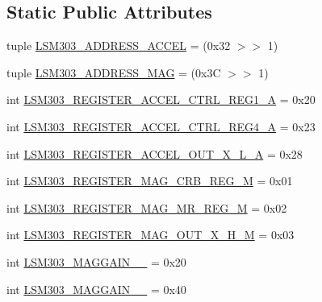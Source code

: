 \subsection*{Static Public Attributes}
\begin{DoxyCompactItemize}
\item 
tuple \hyperlink{classdriver_1_1DRIVER__CORE_1_1Adafruit__LSM303_a24ad319884adc1c09dd29f423b8b6692}{L\+S\+M303\+\_\+\+A\+D\+D\+R\+E\+S\+S\+\_\+\+A\+C\+C\+E\+L} = (0x32 $>$$>$ 1)
\item 
tuple \hyperlink{classdriver_1_1DRIVER__CORE_1_1Adafruit__LSM303_a0b503ed9efa5d7a4d6edc9e02d1cd61f}{L\+S\+M303\+\_\+\+A\+D\+D\+R\+E\+S\+S\+\_\+\+M\+A\+G} = (0x3\+C $>$$>$ 1)
\item 
int \hyperlink{classdriver_1_1DRIVER__CORE_1_1Adafruit__LSM303_ac907d5dc53fef3f3a59a99e7dd969de2}{L\+S\+M303\+\_\+\+R\+E\+G\+I\+S\+T\+E\+R\+\_\+\+A\+C\+C\+E\+L\+\_\+\+C\+T\+R\+L\+\_\+\+R\+E\+G1\+\_\+\+A} = 0x20
\item 
int \hyperlink{classdriver_1_1DRIVER__CORE_1_1Adafruit__LSM303_ab9fecee305847de9273f660412fccf01}{L\+S\+M303\+\_\+\+R\+E\+G\+I\+S\+T\+E\+R\+\_\+\+A\+C\+C\+E\+L\+\_\+\+C\+T\+R\+L\+\_\+\+R\+E\+G4\+\_\+\+A} = 0x23
\item 
int \hyperlink{classdriver_1_1DRIVER__CORE_1_1Adafruit__LSM303_a9db7d714f9448a3ac4121457f1996634}{L\+S\+M303\+\_\+\+R\+E\+G\+I\+S\+T\+E\+R\+\_\+\+A\+C\+C\+E\+L\+\_\+\+O\+U\+T\+\_\+\+X\+\_\+\+L\+\_\+\+A} = 0x28
\item 
int \hyperlink{classdriver_1_1DRIVER__CORE_1_1Adafruit__LSM303_a9ce34b06b2a881fe87f4acf7275e788d}{L\+S\+M303\+\_\+\+R\+E\+G\+I\+S\+T\+E\+R\+\_\+\+M\+A\+G\+\_\+\+C\+R\+B\+\_\+\+R\+E\+G\+\_\+\+M} = 0x01
\item 
int \hyperlink{classdriver_1_1DRIVER__CORE_1_1Adafruit__LSM303_af17a9acb25451a4a2c5f388ff6f95754}{L\+S\+M303\+\_\+\+R\+E\+G\+I\+S\+T\+E\+R\+\_\+\+M\+A\+G\+\_\+\+M\+R\+\_\+\+R\+E\+G\+\_\+\+M} = 0x02
\item 
int \hyperlink{classdriver_1_1DRIVER__CORE_1_1Adafruit__LSM303_a39399d95adf47130963ad6228b41f5b5}{L\+S\+M303\+\_\+\+R\+E\+G\+I\+S\+T\+E\+R\+\_\+\+M\+A\+G\+\_\+\+O\+U\+T\+\_\+\+X\+\_\+\+H\+\_\+\+M} = 0x03
\item 
int \hyperlink{classdriver_1_1DRIVER__CORE_1_1Adafruit__LSM303_a7f838baa79a6ae3da80e428f07c0b9ae}{L\+S\+M303\+\_\+\+M\+A\+G\+G\+A\+I\+N\+\_\+\_} = 0x20
\item 
int \hyperlink{classdriver_1_1DRIVER__CORE_1_1Adafruit__LSM303_a895624eb31381290c41eb4ba15762a21}{L\+S\+M303\+\_\+\+M\+A\+G\+G\+A\+I\+N\+\_\+\_} = 0x40

\end{DoxyCompactItemize}
